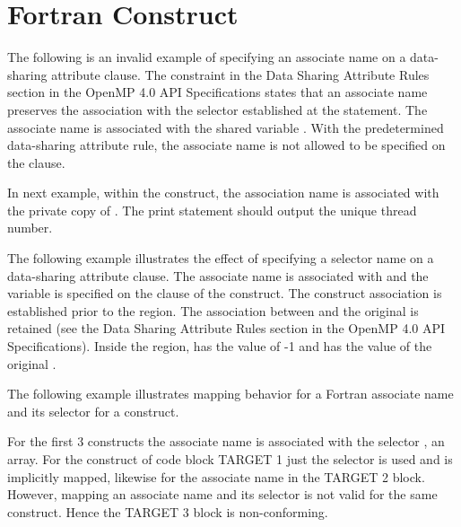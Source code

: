 \pagebreak
\section{Fortran  Construct}
\fortranspecificstart
\label{sec:associate}

The following is an invalid example of specifying an associate name on a data-sharing attribute 
clause. The constraint in the Data Sharing Attribute Rules section in the OpenMP 
4.0 API Specifications states that an associate name preserves the association 
with the selector established at the  statement. The associate 
name  is associated with the shared variable . With the predetermined data-sharing 
attribute rule, the associate name  is not allowed to be specified on the  
clause.


In next example, within the  construct, the association name  
is associated with the private copy of . The print statement should output the 
unique thread number.


The following example illustrates the effect of specifying a selector name on a data-sharing 
attribute clause. The associate name  is associated with  and the variable  
is specified on the  clause of the  construct. 
The construct association is established prior to the  region. 
The association between  and the original  is retained (see the Data Sharing 
Attribute Rules section in the OpenMP 4.0 API Specifications). Inside the  
region,  has the value of -1 and  has the value of the original .

\pagebreak
{}

\begin{figure}[t!]
\end{figure}
\label{sec:associate_target}

\bigskip
The following example illustrates mapping behavior for a Fortran
associate name and its selector for a  construct.

For the first 3  constructs the associate name  is
associated with the selector , an array.  
For the  construct of code block TARGET 1 just the selector
 is used and is implicitly mapped,
likewise for the associate name  in the TARGET 2 block.  
However, mapping an associate name and its selector is not valid for the same
 construct.  Hence the TARGET 3 block is non-conforming.


